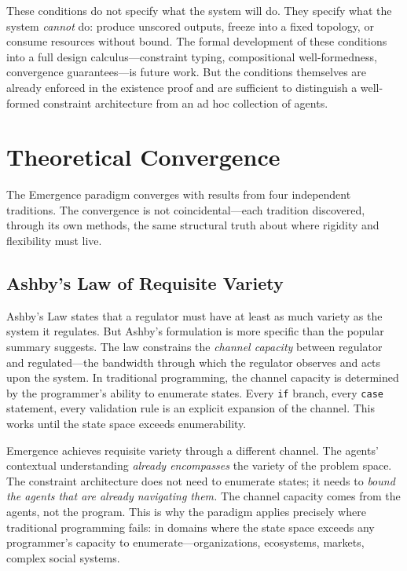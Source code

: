 \documentclass[11pt,twocolumn]{article}
\begin{document}
These conditions do not specify what the system will do.  They specify
what the system \emph{cannot} do: produce unscored outputs, freeze into
a fixed topology, or consume resources without bound.  The formal
development of these conditions into a full design calculus---constraint
typing, compositional well-formedness, convergence guarantees---is
future work.  But the conditions themselves are already enforced in the
existence proof and are sufficient to distinguish a well-formed
constraint architecture from an ad hoc collection of agents.

\section{Theoretical Convergence}
\label{sec:theory}

The Emergence paradigm converges with results from four independent
traditions.  The convergence is not coincidental---each tradition
discovered, through its own methods, the same structural truth about
where rigidity and flexibility must live.

\subsection{Ashby's Law of Requisite Variety}

Ashby's Law \citep{ashby1956introduction} states that a regulator must
have at least as much variety as the system it regulates.  But Ashby's
formulation is more specific than the popular summary suggests.  The law
constrains the \emph{channel capacity} between regulator and
regulated---the bandwidth through which the regulator observes and acts
upon the system.  In traditional programming, the channel capacity is
determined by the programmer's ability to enumerate states.  Every
\texttt{if} branch, every \texttt{case} statement, every validation
rule is an explicit expansion of the channel.  This works until the
state space exceeds enumerability.

Emergence achieves requisite variety through a different channel.  The
agents' contextual understanding \emph{already encompasses} the variety
of the problem space.  The constraint architecture does not need to
enumerate states; it needs to \emph{bound the agents that are already
navigating them.}  The channel capacity comes from the agents, not the
program.  This is why the paradigm applies precisely where traditional
programming fails: in domains where the state space exceeds any
programmer's capacity to enumerate---organizations, ecosystems,
markets, complex social systems.
\end{document}
